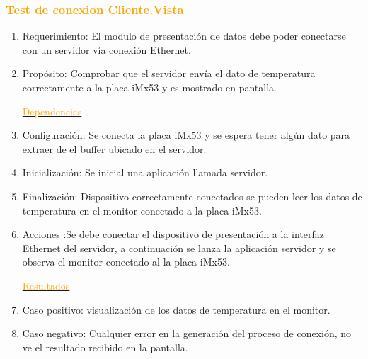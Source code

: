  \subsubsection{\textcolor{orange}{Test de conexion Cliente.Vista }}
\begin{enumerate}
\item Requerimiento: El modulo de presentación de datos debe poder conectarse con un servidor vía conexión Ethernet.
\item Propósito: Comprobar que el servidor envía el dato de temperatura correctamente a la placa iMx53 y es mostrado en pantalla.

\underline{\textcolor{orange}{Dependencias}}

\item Configuración: Se conecta la placa iMx53 y se espera tener algún dato para extraer de el  buffer ubicado en el servidor.
\item Inicialización: Se inicial una aplicación llamada servidor.
\item Finalización: Dispositivo correctamente conectados se pueden leer los datos de temperatura en el monitor conectado a la placa iMx53.   
\item Acciones :Se debe conectar el dispositivo de presentación a la interfaz Ethernet del servidor, a continuación se lanza la aplicación servidor y se observa el monitor conectado al la placa iMx53.

\underline{\textcolor{orange}{Resultados}} 

\item Caso positivo: visualización de los datos de temperatura en el monitor.
\item Caso negativo: Cualquier error en la generación del proceso de conexión, no ve el resultado recibido en la pantalla.

\end{enumerate}








